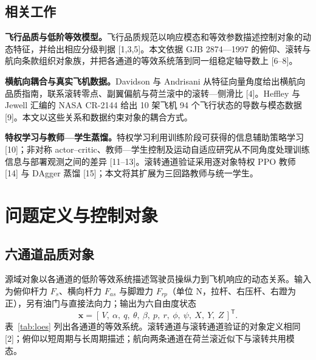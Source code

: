 \documentclass[UTF8,a4paper,11pt,fontset=fandol,scheme=plain]{ctexart}
\begin{document}
\subsection{相关工作}
\textbf{飞行品质与低阶等效模型。}飞行品质规范以响应模态和等效参数描述控制对象的动态特征，并给出相应分级判据 [1,3,5]。本文依据 GJB 2874—1997 的俯仰、滚转与航向条款组织对象族，并把各通道的等效系统落到同一组稳定轴导数上 [6–8]。

\textbf{横航向耦合与真实飞机数据。}Davidson 与 Andrisani 从特征向量角度给出横航向品质指南，联系滚转零点、副翼偏航与荷兰滚中的滚转—侧滑比 [4]。Heffley 与 Jewell 汇编的 NASA CR-2144 给出 10 架飞机 94 个飞行状态的导数与模态数据 [9]。本文以这些关系和数据约束对象的耦合方式。

\textbf{特权学习与教师—学生蒸馏。}特权学习利用训练阶段可获得的信息辅助策略学习 [10]；非对称 actor–critic、教师—学生控制及运动自适应研究从不同角度处理训练信息与部署观测之间的差异 [11–13]。滚转通道验证采用逐对象特权 PPO 教师 [14] 与 DAgger 蒸馏 [15]；本文将其扩展为三回路教师与统一学生。

\section{问题定义与控制对象}
\label{sec:problem}
\subsection{六通道品质对象}
\label{sec:object}
源域对象以各通道的低阶等效系统描述驾驶员操纵力到飞机响应的动态关系。输入为俯仰杆力 \(F_s\)、横向杆力 \(F_{as}\) 与脚蹬力 \(F_{rp}\)（单位 N，拉杆、右压杆、右蹬为正），另有油门与直接法向力；输出为六自由度状态
\begin{equation}
\mathbf x=[\,V,\ \alpha,\ q,\ \theta,\ \beta,\ p,\ r,\ \phi,\ \psi,\ X,\ Y,\ Z\,]^{\mathsf T}.
\end{equation}
表~\ref{tab:loes} 列出各通道的等效系统。滚转通道与滚转通道验证的对象定义相同 [2]；俯仰以短周期与长周期描述；航向两条通道在荷兰滚近似下与滚转共用模态。
\end{document}
